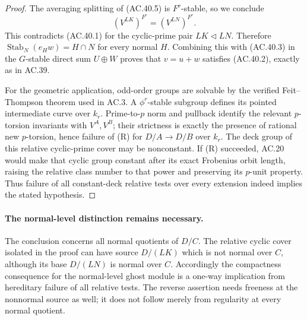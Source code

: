 \begin{proof}
The averaging splitting of (AC.40.5) is \(F^r\)-stable,
so we conclude
\[
                         (V^{LK})^{F^r}=(V^{LN})^{F^r}.
\]
This contradicts (AC.40.1) for the cyclic-prime pair
\(LK\triangleleft LN\). Therefore
\(\operatorname{Stab}_N(e_Hw)=H\cap N\) for every normal
\(H\). Combining this with (AC.40.3) in the
\(G\)-stable direct sum \(U\oplus W\) proves that
\(v=u+w\) satisfies (AC.40.2), exactly as in AC.39.

For the geometric application, odd-order groups are solvable
by the verified Feit--Thompson theorem used in AC.3.
A \(\phi^r\)-stable
subgroup defines its pointed intermediate curve over
\(k_r\). Prime-to-\(p\) norm and pullback identify
the relevant \(p\)-torsion invariants with
\(V^A,V^B\); their strictness is exactly the presence
of rational new \(p\)-torsion, hence failure of (R)
for \(D/A\to D/B\) over \(k_r\). The deck group of
this relative cyclic-prime cover may be nonconstant.
If (R) succeeded, AC.20 would make that cyclic group
constant after its exact Frobenius orbit length,
raising the relative class number to that power and
preserving its \(p\)-unit property. Thus failure of
all constant-deck relative tests over every extension
indeed implies the stated hypothesis.
\end{proof}

\paragraph{The normal-level distinction remains necessary.}
The conclusion concerns all normal quotients of \(D/C\).
The relative cyclic cover isolated in the proof can
have source \(D/(LK)\) which is not normal over \(C\),
although its base \(D/(LN)\) is normal over \(C\).
Accordingly the compactness consequence for the
normal-level ghost module is a one-way implication
from hereditary failure of all relative tests.
The reverse assertion needs freeness at the nonnormal
source as well; it does not follow merely from
regularity at every normal quotient.
